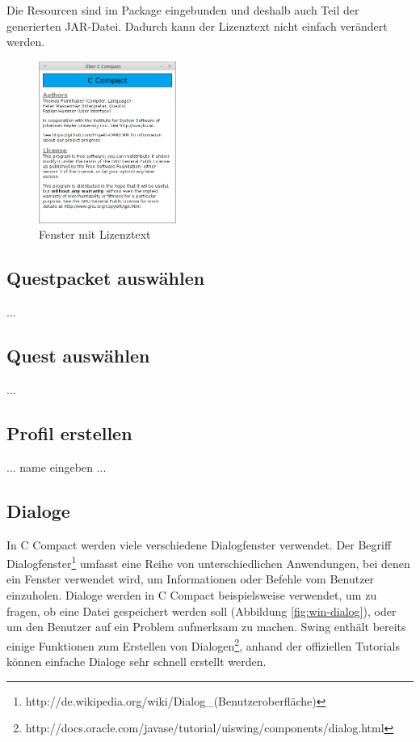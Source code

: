 Die Resourcen sind im Package eingebunden und deshalb auch Teil der generierten JAR-Datei. Dadurch kann der Lizenztext nicht einfach verändert werden.

\begin{figure}[htp]
\centering
\includegraphics[width=0.4\textwidth]{./media/images/gui/elements/Bildschirmfoto-About.png}
\caption{Fenster mit Lizenztext}
\label{fig:win-about}
\end{figure}

\subsection{Questpacket auswählen}
...

\subsection{Quest auswählen}
...

\subsection{Profil erstellen}
... name eingeben ...

\subsection{Dialoge}
\label{sec:win-dialog}
In C Compact werden viele verschiedene Dialogfenster verwendet. Der Begriff Dialogfenster\footnote{http://de.wikipedia.org/wiki/Dialog\_(Benutzeroberfläche)} umfasst eine Reihe von unterschiedlichen Anwendungen, bei denen ein Fenster verwendet wird, um Informationen oder Befehle vom Benutzer einzuholen. Dialoge werden in C Compact beispielsweise verwendet, um zu fragen, ob eine Datei gespeichert werden soll (Abbildung \ref{fig:win-dialog}), oder um den Benutzer auf ein Problem aufmerksam zu machen. Swing enthält bereits einige Funktionen zum Erstellen von Dialogen\footnote{http://docs.oracle.com/javase/tutorial/uiswing/components/dialog.html}, anhand der offiziellen Tutorials können einfache Dialoge sehr schnell erstellt werden.

